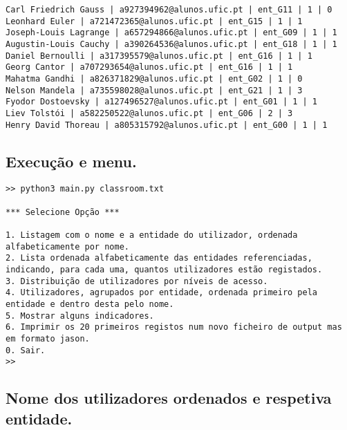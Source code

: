\documentclass[11pt,a4paper]{report}%
\begin{document}
\begin{verbatim}
Carl Friedrich Gauss | a927394962@alunos.ufic.pt | ent_G11 | 1 | 0
Leonhard Euler | a721472365@alunos.ufic.pt | ent_G15 | 1 | 1
Joseph-Louis Lagrange | a657294866@alunos.ufic.pt | ent_G09 | 1 | 1
Augustin-Louis Cauchy | a390264536@alunos.ufic.pt | ent_G18 | 1 | 1
Daniel Bernoulli | a317395579@alunos.ufic.pt | ent_G16 | 1 | 1
Georg Cantor | a707293654@alunos.ufic.pt | ent_G16 | 1 | 1
Mahatma Gandhi | a826371829@alunos.ufic.pt | ent_G02 | 1 | 0
Nelson Mandela | a735598028@alunos.ufic.pt | ent_G21 | 1 | 3
Fyodor Dostoevsky | a127496527@alunos.ufic.pt | ent_G01 | 1 | 1
Liev Tolstói | a582250522@alunos.ufic.pt | ent_G06 | 2 | 3
Henry David Thoreau | a805315792@alunos.ufic.pt | ent_G00 | 1 | 1
\end{verbatim}


\subsection{Execução e menu.}
\begin{small}
\begin{verbatim}
>> python3 main.py classroom.txt

*** Selecione Opção ***

1. Listagem com o nome e a entidade do utilizador, ordenada alfabeticamente por nome.
2. Lista ordenada alfabeticamente das entidades referenciadas, indicando, para cada uma, quantos utilizadores estão registados.
3. Distribuição de utilizadores por níveis de acesso.
4. Utilizadores, agrupados por entidade, ordenada primeiro pela entidade e dentro desta pelo nome.
5. Mostrar alguns indicadores.
6. Imprimir os 20 primeiros registos num novo ficheiro de output mas em formato jason.
0. Sair.
>> 
\end{verbatim}
\end{small}

\subsection{Nome dos utilizadores ordenados e respetiva entidade.}
\end{document}
